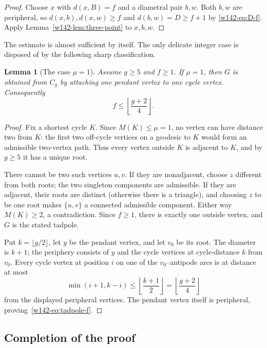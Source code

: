 \documentclass[11pt]{article}
\numberwithin{equation}{section}
\newtheorem{lemma}[theorem]{Lemma}
\theoremstyle{remark}
\begin{document}
\begin{proof}
Choose $x$ with $d(x,B)=f$ and a diametral pair $b,w$.  Both $b,w$ are
peripheral, so $d(x,b),d(x,w)\ge f$ and $d(b,w)=D\ge f+1$ by
\eqref{w142-eq:D-f}.  Apply Lemma~\ref{w142-lem:three-point} to $x,b,w$.
\end{proof}

The estimate is almost sufficient by itself.  The only delicate integer
case is disposed of by the following sharp classification.

\begin{lemma}[The case $\mu=1$]\label{w142-lem:mu-one}
Assume $g\ge5$ and $f\ge1$.  If $\mu=1$, then $G$ is obtained from $C_g$ by
attaching one pendant vertex to one cycle vertex.  Consequently
\begin{equation}\label{w142-eq:tadpole-f}
  f\le\left\lfloor\frac{g+2}{4}\right\rfloor.
\end{equation}
\end{lemma}

\begin{proof}
Fix a shortest cycle $K$.  Since $M(K)\le\mu=1$, no vertex can have distance
two from $K$: the first two off-cycle vertices on a geodesic to $K$ would
form an admissible two-vertex path.  Thus every vertex outside $K$ is
adjacent to $K$, and by $g\ge5$ it has a unique root.

There cannot be two such vertices $u,v$.  If they are nonadjacent, choose
$z$ different from both roots; the two singleton components are admissible.
If they are adjacent, their roots are distinct (otherwise there is a
triangle), and choosing $z$ to be one root makes $\{u,v\}$ a connected
admissible component.  Either way $M(K)\ge2$, a contradiction.  Since
$f\ge1$, there is exactly one outside vertex, and $G$ is the stated tadpole.

Put $k=\lfloor g/2\rfloor$, let $y$ be the pendant vertex, and let $v_0$ be
its root.  The diameter is $k+1$; the periphery consists of $y$ and the cycle
vertices at cycle-distance $k$ from $v_0$.  Every cycle vertex at position
$i$ on one of the $v_0$--antipode arcs is at distance at most
\[
  \min(i+1,k-i)\le\left\lfloor\frac{k+1}{2}\right\rfloor
  =\left\lfloor\frac{g+2}{4}\right\rfloor
\]
from the displayed peripheral vertices.  The pendant vertex itself is
peripheral, proving~\eqref{w142-eq:tadpole-f}.
\end{proof}

\subsection{Completion of the proof}
\end{document}
